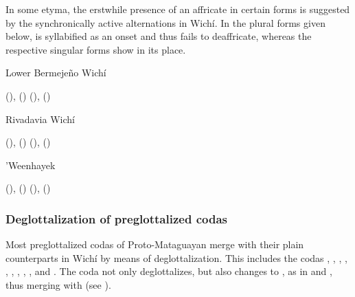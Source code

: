 \begin{exe}
    \ex \rootn
    \ex \dew
    \ex \offspring
    \ex \basetrunk
    \ex \trunk
    \ex \plits
    \ex \starn
\end{exe}

In some etyma, the erstwhile presence of an affricate in certain forms is suggested by the synchronically active alternations in Wichí. In the plural forms given below,  is syllabified as an onset and thus fails to deaffricate, whereas the respective singular forms show  in its place.

\ea\label{ex:s-ts:lbw}
Lower Bermejeño Wichí \citep[191]{VN14}\\
    \begin{xlist}
        \ex {} (\SG),  (\PL)
        \ex {} (\SG),  (\PL)
    \end{xlist}
\z

\ea\label{ex:s-ts:riv}
Rivadavia Wichí \citep[87]{JT09-th}\\
    \begin{xlist}
        \ex {} (\SG),  (\PL)
        \ex {} (\SG),  (\PL)
    \end{xlist}
\z

\ea\label{ex:s-ts:whk}
’Weenhayek \citep[316]{KC16}\\
    \begin{xlist}
        \ex {} (\SG),  (\PL)
        \ex {} (\SG),  (\PL)
    \end{xlist}
\z
{}

\subsubsection{Deglottalization of preglottalized codas}\label{wi-deglottalization-non-nasal-codas}

Most preglottalized codas of Proto-Mataguayan merge with their plain counterparts in Wichí by means of deglottalization. This includes the codas , , , , , , , , , and . The coda  not only deglottalizes, but also changes to , as in  and , thus merging with  (see ).

